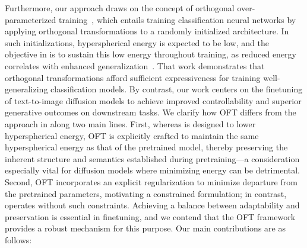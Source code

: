 Furthermore, our approach draws on the concept of orthogonal over-parameterized training~\cite{liu2021orthogonal}, which entails training classification neural networks by applying orthogonal transformations to a randomly initialized architecture. In such initializations, hyperspherical energy is expected to be low, and the objective in \cite{liu2021orthogonal} is to sustain this low energy throughout training, as reduced energy correlates with enhanced generalization~\cite{liu2018learning,lin2020regularizing}. That work demonstrates that orthogonal transformations afford sufficient expressiveness for training well-generalizing classification models. By contrast, our work centers on the finetuning of text-to-image diffusion models to achieve improved controllability and superior generative outcomes on downstream tasks. We clarify how OFT differs from the approach in \cite{liu2021orthogonal} along two main lines. First, whereas \cite{liu2021orthogonal} is designed to lower hyperspherical energy, OFT is explicitly crafted to maintain the same hyperspherical energy as that of the pretrained model, thereby preserving the inherent structure and semantics established during pretraining—a consideration especially vital for diffusion models where minimizing energy can be detrimental. Second, OFT incorporates an explicit regularization to minimize departure from the pretrained parameters, motivating a constrained formulation; in contrast, \cite{liu2021orthogonal} operates without such constraints. Achieving a balance between adaptability and preservation is essential in finetuning, and we contend that the OFT framework provides a robust mechanism for this purpose. Our main contributions are as follows:

